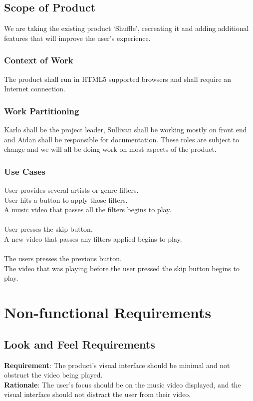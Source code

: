 \documentclass[12pt, titlepage]{article}
\begin{document}
\subsection{Scope of Product}

We are taking the existing product ‘Shuffle’, recreating it and adding additional features that will improve the user's experience.

\subsubsection{Context of Work}

The product shall run in HTML5 supported browsers and shall require an Internet connection.

\subsubsection{Work Partitioning}

Karlo shall be the project leader, Sullivan shall be working mostly on front end and Aidan shall be responsible for documentation.  These roles are subject to change and we will all be doing work on most aspects of the product.

\subsubsection{Use Cases}

User provides several artists or genre filters.\\
User hits a button to apply those filters.\\
A music video that passes all the filters begins to play.\\\\
User presses the skip button.\\
A new video that passes any filters applied begins to play.\\\\
The users presses the previous button. \\
The video that was playing before the user pressed the skip button begins to play.\\


\section{Non-functional Requirements}

\subsection{Look and Feel Requirements}
\textbf{Requirement}: The product's visual interface should be minimal and not obstruct the video being played.\\
\textbf{Rationale}: The user's focus should be on the music video displayed, and the visual interface should not distract the user from their video.
\end{document}
